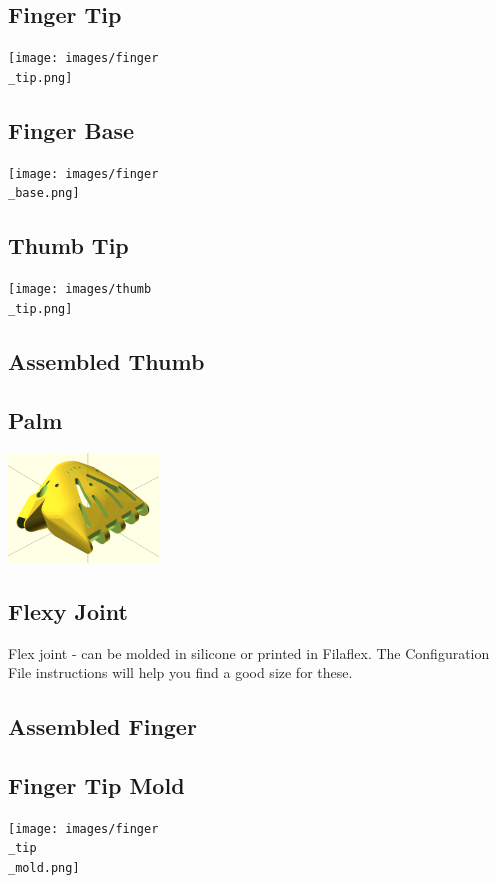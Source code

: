 \documentclass[11pt]{article}
\begin{document}
\hypertarget{thing_finger\_tip}{\subsection{Finger Tip}}
\texttt{[image: images/finger\\\_tip.png]}

\hypertarget{thing_finger\_base}{\subsection{Finger Base}}
\texttt{[image: images/finger\\\_base.png]}

\hypertarget{thing_thumb\_tip}{\subsection{Thumb Tip}}
\texttt{[image: images/thumb\\\_tip.png]}

\hypertarget{thing_thumb\_assembly}{\subsection{Assembled Thumb}}

\hypertarget{thing_palm}{\subsection{Palm}}
\includegraphics[width=4cm]{images/palm.png}

\hypertarget{thing_flexy\_joint}{\subsection{Flexy Joint}}
Flex joint - can be molded in silicone or printed in Filaflex. The Configuration File instructions will help you find a good size for these.

\hypertarget{thing_finger\_assembly}{\subsection{Assembled Finger}}

\hypertarget{thing_finger\_tip\_mold}{\subsection{Finger Tip Mold}}
\texttt{[image: images/finger\\\_tip\\\_mold.png]}
\end{document}
